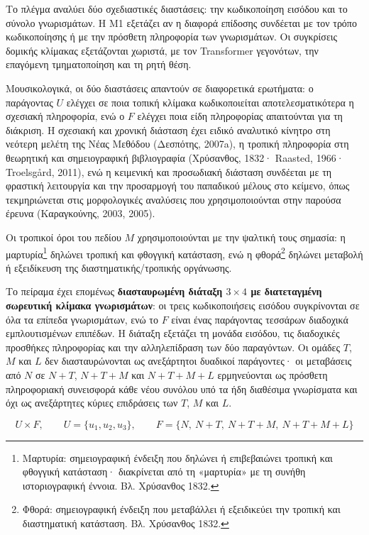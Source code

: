 \documentclass[11pt,a4paper]{article}
\begin{document}
Το πλέγμα αναλύει δύο σχεδιαστικές διαστάσεις: την κωδικοποίηση εισόδου και το σύνολο γνωρισμάτων. Η M1 εξετάζει αν η διαφορά επίδοσης συνδέεται με τον τρόπο κωδικοποίησης ή με την πρόσθετη πληροφορία των γνωρισμάτων. Οι συγκρίσεις δομικής κλίμακας εξετάζονται χωριστά, με τον Transformer γεγονότων, την επαγόμενη τμηματοποίηση και τη ρητή θέση.

Μουσικολογικά, οι δύο διαστάσεις απαντούν σε διαφορετικά ερωτήματα: ο παράγοντας \(U\) ελέγχει σε ποια τοπική κλίμακα κωδικοποιείται αποτελεσματικότερα η σχεσιακή πληροφορία, ενώ ο \(F\) ελέγχει ποια είδη πληροφορίας απαιτούνται για τη διάκριση. Η σχεσιακή και χρονική διάσταση έχει ειδικό αναλυτικό κίνητρο στη νεότερη μελέτη της Νέας Μεθόδου (Δεσπότης, 2007a), η τροπική πληροφορία στη θεωρητική και σημειογραφική βιβλιογραφία (Χρύσανθος, 1832· Raasted, 1966· Troelsgård, 2011), ενώ η κειμενική και προσωδιακή διάσταση συνδέεται με τη φραστική λειτουργία και την προσαρμογή του παπαδικού μέλους στο κείμενο, όπως τεκμηριώνεται στις μορφολογικές αναλύσεις που χρησιμοποιούνται στην παρούσα έρευνα (Καραγκούνης, 2003, 2005).

Οι τροπικοί όροι του πεδίου $M$ χρησιμοποιούνται με την ψαλτική τους σημασία: η μαρτυρία\footnote{Μαρτυρία: σημειογραφική ένδειξη που δηλώνει ή επιβεβαιώνει τροπική και φθογγική κατάσταση· διακρίνεται από τη «μαρτυρία» με τη συνήθη ιστοριογραφική έννοια. Βλ. Χρύσανθος 1832.} δηλώνει τροπική και φθογγική κατάσταση, ενώ η φθορά\footnote{Φθορά: σημειογραφική ένδειξη που μεταβάλλει ή εξειδικεύει την τροπική και διαστηματική κατάσταση. Βλ. Χρύσανθος 1832.} δηλώνει μεταβολή ή εξειδίκευση της διαστηματικής/τροπικής οργάνωσης.\par

Το πείραμα έχει επομένως \textbf{διασταυρωμένη διάταξη \(3\times4\) με διατεταγμένη σωρευτική κλίμακα γνωρισμάτων}: οι τρεις κωδικοποιήσεις εισόδου συγκρίνονται σε όλα τα επίπεδα γνωρισμάτων, ενώ το \(F\) είναι ένας παράγοντας τεσσάρων διαδοχικά εμπλουτισμένων επιπέδων. Η διάταξη εξετάζει τη μονάδα εισόδου, τις διαδοχικές προσθήκες πληροφορίας και την αλληλεπίδραση των δύο παραγόντων. Οι ομάδες \(T\), \(M\) και \(L\) δεν διασταυρώνονται ως ανεξάρτητοι δυαδικοί παράγοντες· οι μεταβάσεις από \(N\) σε \(N{+}T\), \(N{+}T{+}M\) και \(N{+}T{+}M{+}L\) ερμηνεύονται ως πρόσθετη πληροφοριακή συνεισφορά κάθε νέου συνόλου υπό τα ήδη διαθέσιμα γνωρίσματα και όχι ως ανεξάρτητες κύριες επιδράσεις των \(T\), \(M\) και \(L\).

\[
U \times F,\qquad
U=\{u_1,u_2,u_3\},\qquad
F=\{N,\ N{+}T,\ N{+}T{+}M,\ N{+}T{+}M{+}L\}
\]
\end{document}
